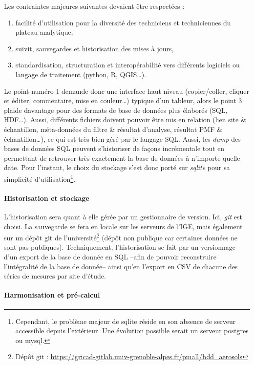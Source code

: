 Les contraintes majeures suivantes devaient être respectées :
\begin{enumerate}
    \item facilité d'utilisation pour la diversité des techniciens et techniciennes du
        plateau analytique,
    \item suivit, sauvegardes et historisation des mises à jours,
    \item standardisation, structuration et interopérabilité vers différents logiciels ou
        langage de traitement (python, R, QGIS…).
\end{enumerate}
Le point numéro 1 demande donc une interface haut niveau (copier/coller, cliquer et
éditer, commentaire, mise en couleur…) typique d'un tableur, alors le point 3 plaide
davantage pour des formats de base de données plus élaborés (SQL, HDF…).
Aussi, différents fichiers doivent pouvoir être mis en relation (lien site \&
échantillon, méta-données du
filtre \& résultat d'analyse, résultat PMF \& échantillon…), ce qui est très bien géré
par le langage SQL. Aussi, les \textit{dump} des bases de données SQL peuvent s'historiser
de façons incrémentale tout en permettant de retrouver très exactement la base de données à
n'importe quelle date. 
Pour l'instant, le choix du stockage s'est donc porté sur \textit{sqlite} pour sa
simplicité d'utilisation\footnote{Cependant, le problème majeur de sqlite réside en son
    absence de serveur accessible depuis l'extérieur. Une évolution possible serait un
serveur postgres ou mysql.}.

\paragraph{Historisation et stockage}%
\label{par:historisation_et_stockage}

L'historisation sera quant à elle gérée par un gestionnaire de version. Ici, \textit{git}
est choisi. La sauvegarde se fera en locale sur les serveurs de l'IGE, mais également sur
un dépôt git de l'université\footnote{Dépôt git :
\url{https://gricad-gitlab.univ-grenoble-alpes.fr/pmall/bdd_aerosols}} (dépôt non
publique car certaines données ne sont pas publiques).
Techniquement, l'historisation se fait par un versionnage d'un export de la base de donnée en
SQL --afin de pouvoir reconstruire l'intégralité de la base de donnée-- ainsi qu'en
l'export en CSV de chacune des séries de mesures par site d'étude.

\paragraph{Harmonisation et pré-calcul}%
\label{par:harmonisation_et_pré_calcul}

